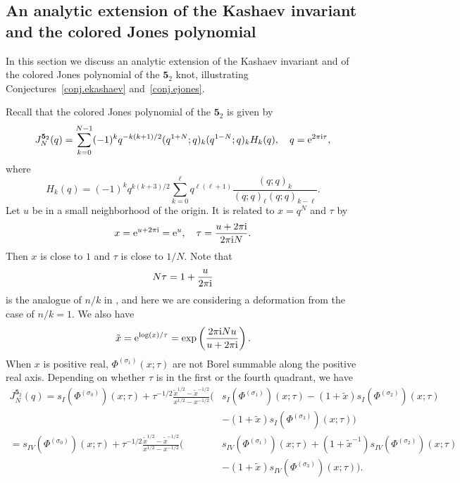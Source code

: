 \documentclass[12pt,reqno]{amsart}
\theoremstyle{definition}
\def\s{\sigma}
\def\tx{\tilde{x}}
\def\ri{\mathrm{i}}
\def\tx{\tilde{x}}
\def\re{{\rm e}}
\def\ri{{\rm i}}
\def\md{\mathbf}
\newcommand{\knot}[1]{\md{#1}}
\newcommand{\nn}{\nonumber \\}
\begin{document}
\subsection{An analytic extension of the Kashaev invariant and the
  colored Jones polynomial}

In this section we discuss an analytic extension of the Kashaev invariant
and of the colored Jones polynomial of the $\knot{5}_2$ knot, illustrating
Conjectures~\ref{conj.ekashaev} and~\ref{conj.ejones}. 

Recall that the colored Jones polynomial of the $\knot{5}_2$ is given by
\begin{equation}
  J^{\knot{5}_2}_N(q) = \sum_{k=0}^{N-1}(-1)^k
  q^{-k(k+1)/2}(q^{1+N};q)_k(q^{1-N};q)_k H_k(q),\quad
  q = \re^{2\pi\ri \tau},
\end{equation}
where
\begin{equation}
  H_k(q) = (-1)^kq^{k(k+3)/2}\sum_{k=0}^\ell q^{\ell(\ell+1)}
  \frac{(q;q)_k}{(q;q)_\ell(q;q)_{k-\ell}}.
\end{equation}
Let $u$ be in a small neighborhood of the origin. It is related to $x = q^N$
and $\tau$ by
\begin{equation}
  x = \re^{u+2\pi\ri} = \re^{u},\quad \tau = \frac{u+2\pi\ri}{2\pi\ri N}.
  \label{eq:x-n-tau52}
\end{equation}
Then $x$ is close to $1$ and $\tau$ is close to $1/N$.
Note that
\begin{equation}
  N\tau = 1+\frac{u}{2\pi\ri}
\end{equation}
is the analogue of $n/k$ in \cite{gukov}, and here we are
considering a deformation from the case of $n/k=1$.  We also have
\begin{equation}
  \tx = \re^{\log(x)/\tau} =
  \exp\left(\frac{2\pi\ri N u}{u+2\pi\ri}\right).
\end{equation}
When $x$ is positive real, $\Phi^{(\s_1)}(x;\tau)$ are not Borel
summable along the positive real axis.  Depending on whether $\tau$ is
in the first or the fourth quadrant, we have 
\begin{subequations}
  \begin{align}
    J^{\knot{5}_2}_N(q) =
    s_{I}(\Phi^{(\s_0)})(x;\tau)
    +\tau^{-1/2}\frac{\tx^{1/2}-\tx^{-1/2}}{x^{1/2}-x^{-1/2}} %
    \big(
    &s_{I}(\Phi^{(\s_1)})(x;\tau)
      -(1+\tx)s_{I}(\Phi^{(\s_2)})(x;\tau)\nn
    &-(1+\tx)s_{I}(\Phi^{(\s_3)})(x;\tau)
      \big)
      \label{eq:Jn-s1-52}
    \\  =
    s_{IV}(\Phi^{(\s_0)})(x;\tau)  +\tau^{-1/2}
    \frac{\tx^{1/2}-\tx^{-1/2}}{x^{1/2}-x^{-1/2}} %
    \big(
    &s_{IV}(\Phi^{(\s_1)})(x;\tau)
      +(1+\tx^{-1})s_{IV}(\Phi^{(\s_2)})(x;\tau)\nn
    &-(1+\tx)s_{IV}(\Phi^{(\s_3)})(x;\tau)
      \big).
      \label{eq:Jn-s2-52}
    \end{align}
\end{subequations}    
\end{document}
